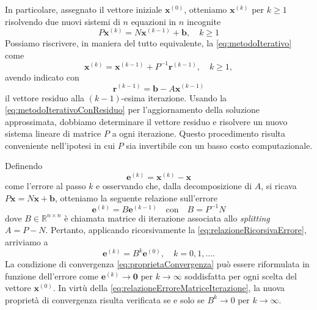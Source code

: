 In particolare, assegnato il vettore iniziale $\mathbf{x}^{(0)}$, otteniamo $\mathbf{x}^{(k)}$ per $k\ge1$ risolvendo due nuovi sistemi di $n$ equazioni in $n$
incognite
\begin{equation}
    \label{eq:metodoIterativo}
    P\mathbf{x}^{(k)}=N\mathbf{x}^{(k-1)} + \mathbf{b},\quad k\ge1
\end{equation}
Possiamo riscrivere, in maniera del tutto equivalente, la \eqref{eq:metodoIterativo} come
\begin{equation}
    \label{eq:metodoIterativoConResiduo}
    \mathbf{x}^{(k)}=\mathbf{x}^{(k-1)} + P^{-1}\mathbf{r}^{(k-1)},\quad k\ge1,
\end{equation}
avendo indicato con
\[
    \mathbf{r}^{(k-1)}=\mathbf{b}-A\mathbf{x}^{(k-1)}
\]
il vettore residuo alla $(k-1)$-esima iterazione.\newline
Usando la \eqref{eq:metodoIterativoConResiduo} per l'aggiornamento della soluzione approssimata, dobbiamo determinare il vettore residuo e risolvere un nuovo sistema lineare di
matrice $P$ a ogni iterazione.\newline
Questo procedimento risulta conveniente nell'ipotesi in cui $P$ sia invertibile con un basso costo computazionale.

Definendo
\begin{equation}
    \label{eq:errorePassoK}
    \mathbf{e}^{(k)} = \mathbf{x}^{(k)}-\mathbf{x}
\end{equation}
come l'errore al passo $k$ e osservando che, dalla decomposizione di $A$, si ricava $P\mathbf{x}= N\mathbf{x}+\mathbf{b}$, otteniamo la seguente relazione sull'errore
\begin{equation}
    \label{eq:relazioneRicorsivaErrore}
    \mathbf{e}^{(k)} = B\mathbf{e}^{(k-1)} \quad \text{con} \quad B = P^{-1}N
\end{equation}
dove $B\in\mathbb{R}^{n \times n}$ \`e chiamata matrice di iterazione associata allo \textit{splitting} $A = P - N$.
Pertanto, applicando ricorsivamente la \eqref{eq:relazioneRicorsivaErrore}, arriviamo a
\begin{equation}
    \label{eq:relazioneErroreMatriceIterazione}
    \mathbf{e}^{(k)}=B^{k}\mathbf{e}^{(0)},\quad k = 0, 1, \dots.
\end{equation}
La condizione di convergenza \eqref{eq:proprietaConvergenza} pu\`o essere riformulata in funzione dell'errore come
$\mathbf{e}^{(k)} \rightarrow \mathbf{0} \text{ per } k\rightarrow{\infty}$ soddisfatta per ogni scelta del vettore $\mathbf{x}^{(0)}$.\newline
In virt\`u della \eqref{eq:relazioneErroreMatriceIterazione}, la nuova propriet\`a di convergenza risulta verificata se e solo se ${B}^{k} \rightarrow 0 \text{ per } k\rightarrow{\infty}$.


